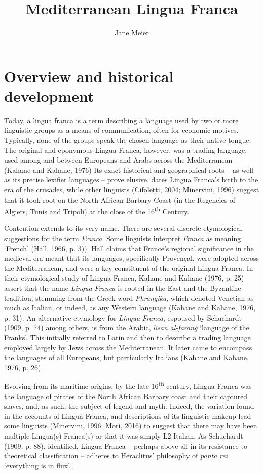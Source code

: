 \documentclass[output=paper]{langsci/langscibook}
\title{Mediterranean Lingua Franca}
\author{%
 Jane Meier  \affiliation{University of Eden}  
}
\begin{document}
\section{Overview and historical development}

Today, a lingua franca is a term describing a language used by two or more linguistic groups as a means of communication, often for economic motives. Typically, none of the groups speak the chosen language as their native tongue. The original and eponymous Lingua Franca, however, was a trading language, used among and between Europeans and Arabs across the Mediterranean (Kahane and Kahane, 1976) Its exact historical and geographical roots – as well as its precise lexifier languages – prove elusive. \citet{Hall1966} dates Lingua Franca’s birth to the era of the crusades, while other linguists (Cifoletti, 2004; Minervini, 1996) suggest that it took root on the North African Barbary Coast (in the Regencies of Algiers, Tunis and Tripoli) at the close of the 16\textsuperscript{th} Century. 

Contention extends to its very name. There are several discrete etymological suggestions for the term \textit{Franca}.  Some linguists interpret \textit{Franca} as meaning ‘French’ (Hall, 1966, p. 3)). Hall claims that France’s regional significance in the medieval era meant that its languages, specifically Provençal, were adopted across the Mediterranean, and were a key constituent of the original Lingua Franca. In their etymological study of Lingua Franca, Kahane and Kahane (1976, p. 25) assert that the name \textit{Lingua} \textit{Franca} is rooted in the East and the Byzantine tradition, stemming from the Greek word \textit{Phrangika}, which denoted Venetian as much as Italian, or indeed, as any Western language (Kahane and Kahane, 1976, p. 31). An alternative etymology for \textit{Lingua} \textit{Franca}, espoused by Schuchardt (1909, p. 74) among others, is from the Arabic, \textit{lisān} \textit{al-faranǧ} ‘language of the Franks’. This initially referred to Latin and then to describe a trading language employed largely by Jews across the Mediterranean. It later came to encompass the languages of all Europeans, but particularly Italians (Kahane and Kahane, 1976, p. 26).  

Evolving from its maritime origins, by the late 16\textsuperscript{th} century, Lingua Franca was the language of pirates of the North African Barbary coast and their captured slaves, and, as such, the subject of legend and myth. Indeed, the variation found in the accounts of Lingua Franca, and descriptions of its linguistic makeup lead some linguists (Minervini, 1996; Mori, 2016) to suggest that there may have been multiple Lingua(s) Franca(s) or that it was simply L2 Italian. As Schuchardt (1909, p. 88), identified, Lingua Franca – perhaps above all in its resistance to theoretical classification – adheres to Heraclitus’ philosophy of \textit{panta} \textit{rei}  ‘everything is in flux’. 
\end{document}
